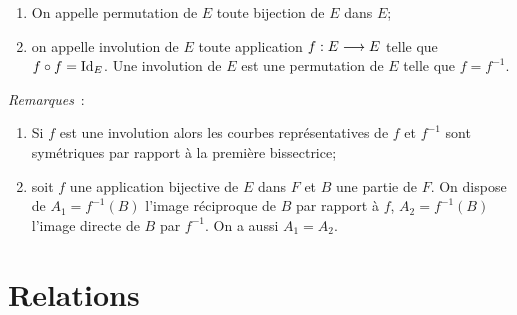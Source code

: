 \begin{defdef}
    \begin{enumerate}
        \item On appelle permutation de \(E\) toute bijection de \(E\) dans \(E\);
        \item on appelle involution de \(E\) toute application 
            \(f:E \longrightarrow E\) telle que \(f \circ f=\operatorname{Id}_E\). Une 
            involution de \(E\) est une permutation de \(E\) telle que 
            \(f=f^{-1}\).
    \end{enumerate}
\end{defdef}
\emph{Remarques}~:
\begin{enumerate}
    \item Si \(f\) est une involution alors les courbes représentatives de \(f\) 
        et \(f^{-1}\) sont symétriques par rapport à la première bissectrice;
    \item soit \(f\) une application bijective de \(E\) dans \(F\) et \(B\) une 
        partie de \(F\). On dispose de \(A_1=f^{-1}(B)\) l'image réciproque de 
        \(B\) par rapport à \(f\), \(A_2=f^{-1}(B)\) l'image directe de \(B\) 
        par \(f^{-1}\). On a aussi \(A_1=A_2\).
\end{enumerate}
\section{Relations}
\label{chap3-sec:relations}
